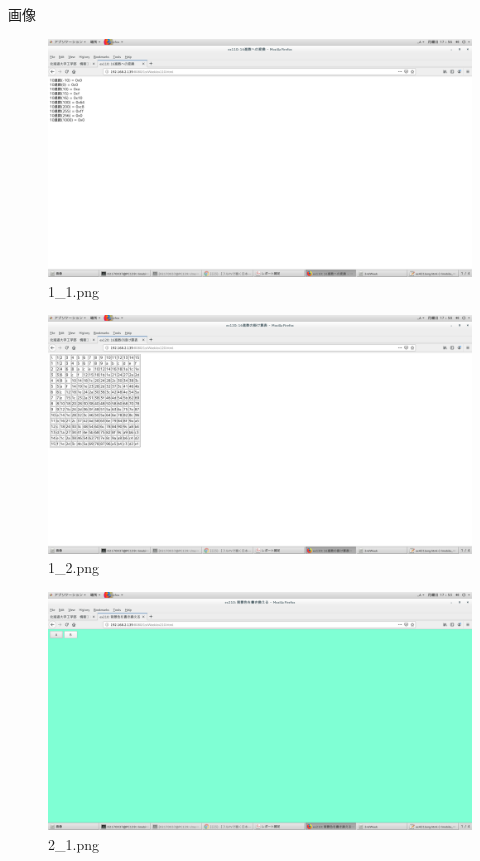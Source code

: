 \documentclass[a4j]{jarticle}
\begin{document}
\newpage
{\rm \huge 画像}

  \begin{figure}[htbp]
    \centering
    \includegraphics[width=13cm]{../webapp/png/1_1.png}
    \caption{1\_1.png}
  \end{figure}

  \vspace{1cm}
  \begin{figure}[htbp]
    \centering
    \includegraphics[width=13cm]{../webapp/png/1_2.png}
    \caption{1\_2.png}
  \end{figure}

  \vspace{1cm}
  \begin{figure}[htbp]
    \centering
    \includegraphics[width=13cm]{../webapp/png/2_1.png}
    \caption{2\_1.png}
  \end{figure}
\end{document}
